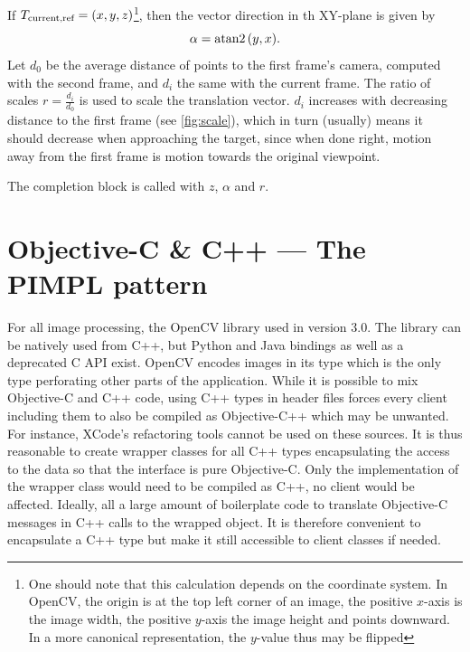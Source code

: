 If $T_{\text{current,ref}} = (x,y,z)$\footnote{One should note that this
   calculation depends on the coordinate system. In OpenCV, the origin is at the
   top left corner of an image, the positive $x$-axis is the image width, the
   positive $y$-axis the image height and points downward. In a more canonical
representation, the $y$-value thus may be flipped}, then the vector direction
in th XY-plane is given by 
\begin{equation*}
   \alpha = \atan2{(y,x)}.
\end{equation*}
Let $d_0$ be the average distance of points to the first frame's camera,
computed with the second frame, and $d_i$ the same with the current frame. The
ratio of scales $r=\frac{d_i}{d_0}$ is used to scale the translation vector. $d_i$
increases with decreasing distance to the first frame (see \autoref{fig:scale}),
which in turn (usually) means it should decrease when approaching the target,
since when done right, motion away from the first frame is motion towards the
original viewpoint.

The completion block is called with $z$, $\alpha$ and $r$.

\section{Objective-C \& C++ --- The PIMPL pattern}

For all image processing, the OpenCV library used in version 3.0. The library
can be natively used from C++, but Python and Java bindings as well as a
deprecated C API exist. OpenCV encodes images in its  type which is
the only type perforating other parts of the application.  While it is possible
to mix Objective-C and C++ code, using C++ types in header files forces every
client including them to also be compiled as Objective-C++ which may be
unwanted. For instance, XCode's refactoring tools cannot be used on these
sources. It is thus reasonable to create wrapper classes for all C++ types
encapsulating the access to the data so that the interface is pure Objective-C.
Only the implementation of the wrapper class would need to be compiled as C++,
no client would be affected. Ideally, all a large amount of boilerplate code to
translate Objective-C messages in C++ calls to the wrapped object.  It is
therefore convenient to encapsulate a C++ type but make it still accessible to
client classes if needed. 

